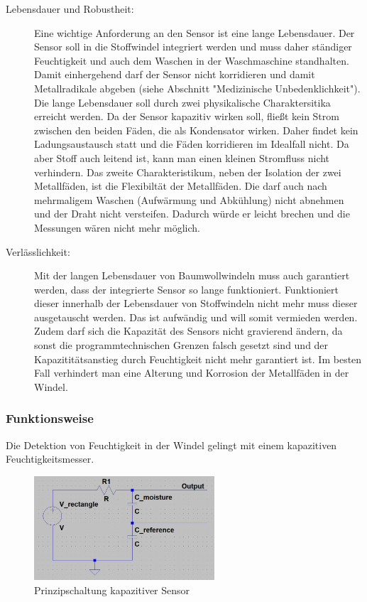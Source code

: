 \begin{description}
 \item[Lebensdauer und Robustheit:]
Eine wichtige Anforderung an den Sensor ist eine lange Lebensdauer. Der Sensor soll in die Stoffwindel integriert werden und muss daher ständiger Feuchtigkeit und auch dem Waschen in der Waschmaschine standhalten. Damit einhergehend darf der Sensor nicht korridieren und damit Metallradikale abgeben (siehe Abschnitt "Medizinische Unbedenklichkeit"). Die lange Lebensdauer soll durch zwei physikalische Charaktersitika erreicht werden. Da der Sensor kapazitiv wirken soll, fließt kein Strom zwischen den beiden Fäden, die als Kondensator wirken. Daher findet kein Ladungsaustausch statt und die Fäden korridieren im Idealfall nicht. Da aber Stoff auch leitend ist, kann man einen kleinen Stromfluss nicht verhindern. Das zweite Charakteristikum, neben der Isolation der zwei Metallfäden, ist die Flexibiltät der Metallfäden. Die darf auch nach mehrmaligem Waschen (Aufwärmung und Abkühlung) nicht abnehmen und der Draht nicht versteifen. Dadurch würde er leicht brechen und die Messungen wären nicht mehr möglich. 

 \item[Verlässlichkeit:]
Mit der langen Lebensdauer von Baumwollwindeln muss auch garantiert werden, dass der integrierte Sensor so lange funktioniert. Funktioniert dieser innerhalb der Lebensdauer von Stoffwindeln nicht mehr muss dieser ausgetauscht werden. Das ist aufwändig und will somit vermieden werden. Zudem darf sich die Kapazität des Sensors nicht gravierend ändern, da sonst die programmtechnischen Grenzen falsch gesetzt sind und der Kapazititätsanstieg durch Feuchtigkeit nicht mehr garantiert ist. Im besten Fall verhindert man eine Alterung und Korrosion der Metallfäden in der Windel.  
\end{description}

\subsubsection{Funktionsweise}
Die Detektion von Feuchtigkeit in der Windel gelingt mit einem kapazitiven Feuchtigkeitsmesser.

\begin{figure}[ht]
	\centering
		\includegraphics[width=0.6\textwidth]{includes/kom/graphics/cap_sensor_circuit}
	\caption{Prinzipschaltung kapazitiver Sensor}
	\label{fig:cap_sensor}
\end{figure}


